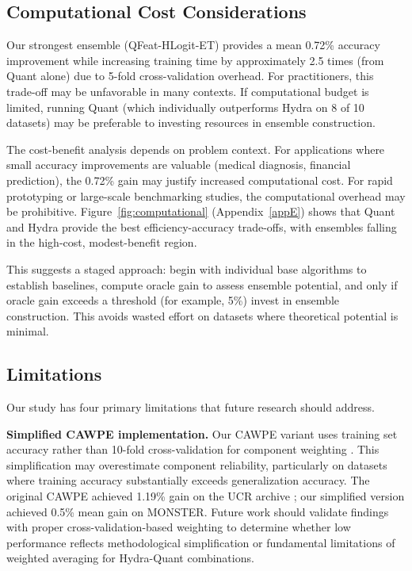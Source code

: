 \documentclass[pdflatex,sn-basic]{sn-jnl}           %
\theoremstyle{thmstyleone}%
\theoremstyle{thmstyletwo}%
\theoremstyle{thmstylethree}%
\begin{document}
\subsection{Computational Cost Considerations}

Our strongest ensemble (QFeat-HLogit-ET) provides a mean 0.72\% accuracy improvement while increasing training time by approximately 2.5 times (from Quant alone) due to 5-fold cross-validation overhead. For practitioners, this trade-off may be unfavorable in many contexts. If computational budget is limited, running Quant (which individually outperforms Hydra on 8 of 10 datasets) may be preferable to investing resources in ensemble construction.

The cost-benefit analysis depends on problem context. For applications where small accuracy improvements are valuable (medical diagnosis, financial prediction), the 0.72\% gain may justify increased computational cost. For rapid prototyping or large-scale benchmarking studies, the computational overhead may be prohibitive. Figure~\ref{fig:computational} (Appendix~\ref{appE}) shows that Quant and Hydra provide the best efficiency-accuracy trade-offs, with ensembles falling in the high-cost, modest-benefit region.

This suggests a staged approach: begin with individual base algorithms to establish baselines, compute oracle gain to assess ensemble potential, and only if oracle gain exceeds a threshold (for example, 5\%) invest in ensemble construction. This avoids wasted effort on datasets where theoretical potential is minimal.

\subsection{Limitations}

Our study has four primary limitations that future research should address.

\textbf{Simplified CAWPE implementation.} Our CAWPE variant uses training set accuracy rather than 10-fold cross-validation for component weighting \citep{cawpe}. This simplification may overestimate component reliability, particularly on datasets where training accuracy substantially exceeds generalization accuracy. The original CAWPE achieved 1.19\% gain on the UCR archive \citep[Figure~8]{cawpe}; our simplified version achieved 0.5\% mean gain on MONSTER. Future work should validate findings with proper cross-validation-based weighting to determine whether low performance reflects methodological simplification or fundamental limitations of weighted averaging for Hydra-Quant combinations.
\end{document}
